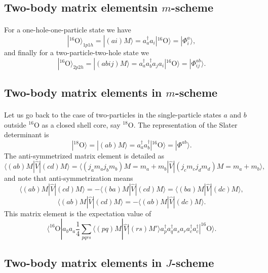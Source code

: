 \documentclass[%
twoside,                 %
final,                   %
10pt]{article}
\begin{document}
\subsection*{Two-body matrix elementsin $m$-scheme}

\paragraph{}
For a one-hole-one-particle state we have
\[
|^{16}\mathrm{O}\rangle_{1p1h} =|(ai)M\rangle  = a_a^{\dagger}a_i|^{16}\mathrm{O}\rangle=|\Phi_{i}^a\rangle,
\]
and finally for a two-particle-two-hole state we 
\[
|^{16}\mathrm{O}\rangle_{2p2h} =|(abij)M\rangle  = a_a^{\dagger}a_b^{\dagger}a_ja_i|^{16}\mathrm{O}\rangle=|\Phi_{ij}^{ab}\rangle.
\]



\subsection*{Two-body matrix elements in $m$-scheme}

\paragraph{}
Let us go back to the case of two-particles in the single-particle states $a$ and $b$ outside ${}^{16}\mbox{O}$ as a closed shell core, say ${}^{18}\mbox{O}$.
The representation of the Slater determinant is 
\[
|^{18}\mathrm{O}\rangle =|(ab)M\rangle  = a^{\dagger}_aa^{\dagger}_b|^{16}\mathrm{O}\rangle=|\Phi^{ab}\rangle.
\]
The anti-symmetrized matrix element is detailed as 
\[
\langle (ab) M | \hat{V} | (cd) M \rangle = \langle (j_am_aj_bm_b)M=m_a+m_b |  \hat{V} | (j_cm_cj_dm_d)M=m_a+m_b \rangle,
\]
and note that anti-symmetrization means 
\[
\langle (ab) M | \hat{V} | (cd) M \rangle =-\langle (ba) M | \hat{V} | (cd) M \rangle =\langle (ba) M | \hat{V} | (dc) M \rangle,
\]
\[
\langle (ab) M | \hat{V} | (cd) M \rangle =-\langle (ab) M | \hat{V} | (dc) M \rangle. 
\]
This matrix element is the expectation value of 
\[
\langle ^{16}\mathrm{O}|a_ba_a\frac{1}{4}\sum_{pqrs}\langle (pq) M | \hat{V} | (rs) M' \rangle a^{\dagger}_pa^{\dagger}_qa_sa_r a^{\dagger}_ca^{\dagger}_c|^{16}\mathrm{O}\rangle.
\]




\subsection*{Two-body matrix elements in $J$-scheme}
\end{document}
